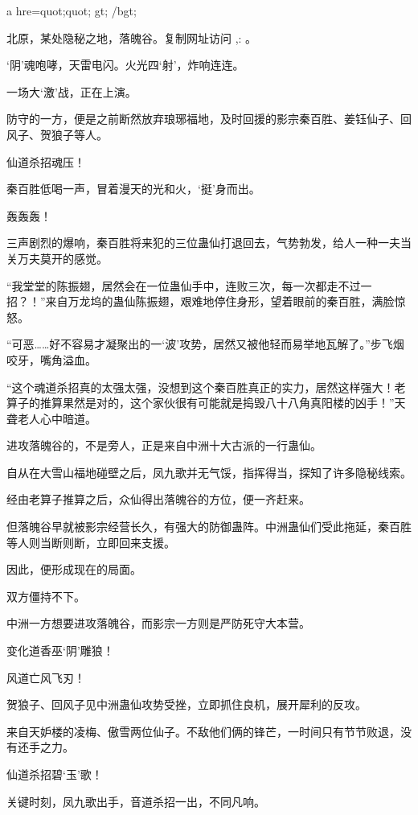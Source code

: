 
\begin{this_body}

a hre=quot;quot;  gt; /bgt;

北原，某处隐秘之地，落魄谷。复制网址访问 ,: 。

‘阴’魂咆哮，天雷电闪。火光四‘射’，炸响连连。

一场大‘激’战，正在上演。

防守的一方，便是之前断然放弃琅琊福地，及时回援的影宗秦百胜、姜钰仙子、回风子、贺狼子等人。

仙道杀招魂压！

秦百胜低喝一声，冒着漫天的光和火，‘挺’身而出。

轰轰轰！

三声剧烈的爆响，秦百胜将来犯的三位蛊仙打退回去，气势勃发，给人一种一夫当关万夫莫开的感觉。

“我堂堂的陈振翅，居然会在一位蛊仙手中，连败三次，每一次都走不过一招？！”来自万龙坞的蛊仙陈振翅，艰难地停住身形，望着眼前的秦百胜，满脸惊怒。

“可恶……好不容易才凝聚出的一‘波’攻势，居然又被他轻而易举地瓦解了。”步飞烟咬牙，嘴角溢血。

“这个魂道杀招真的太强太强，没想到这个秦百胜真正的实力，居然这样强大！老算子的推算果然是对的，这个家伙很有可能就是捣毁八十八角真阳楼的凶手！”天聋老人心中暗道。

进攻落魄谷的，不是旁人，正是来自中洲十大古派的一行蛊仙。

自从在大雪山福地碰壁之后，凤九歌并无气馁，指挥得当，探知了许多隐秘线索。

经由老算子推算之后，众仙得出落魄谷的方位，便一齐赶来。

但落魄谷早就被影宗经营长久，有强大的防御蛊阵。中洲蛊仙们受此拖延，秦百胜等人则当断则断，立即回来支援。

因此，便形成现在的局面。

双方僵持不下。

中洲一方想要进攻落魄谷，而影宗一方则是严防死守大本营。

变化道香巫‘阴’雕狼！

风道亡风飞刃！

贺狼子、回风子见中洲蛊仙攻势受挫，立即抓住良机，展开犀利的反攻。

来自天妒楼的凌梅、傲雪两位仙子。不敌他们俩的锋芒，一时间只有节节败退，没有还手之力。

仙道杀招碧‘玉’歌！

关键时刻，凤九歌出手，音道杀招一出，不同凡响。


\end{this_body}
